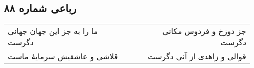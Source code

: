 \begin{center}
\section*{رباعی شماره ۸۸}
\label{sec:sh088}
\begin{longtable}{l p{0.5cm} r}
ما را به جز این جهان جهانی دگرست
&&
جز دوزخ و فردوس مکانی دگرست
\\
قلاشی و عاشقیش سرمایهٔ ماست
&&
قوالی و زاهدی از آنی دگرست
\\
\end{longtable}
\end{center}
